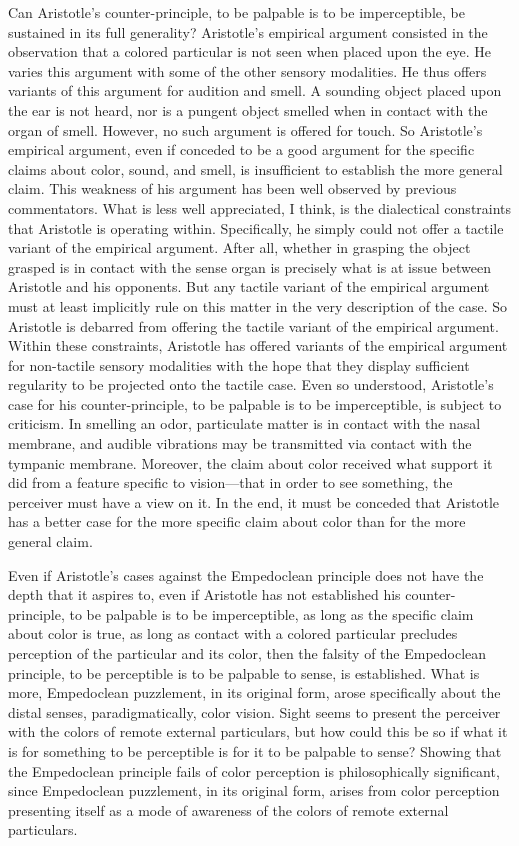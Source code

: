 Can Aristotle's counter-principle, to be palpable is to be imperceptible, be sustained in its full generality? Aristotle's empirical argument consisted in the observation that a colored particular is not seen when placed upon the eye. He varies this argument with some of the other sensory modalities. He thus offers variants of this argument for audition and smell. A sounding object placed upon the ear is not heard, nor is a pungent object smelled when in contact with the organ of smell. However, no such argument is offered for touch. So Aristotle's empirical argument, even if conceded to be a good argument for the specific claims about color, sound, and smell, is insufficient to establish the more general claim. This weakness of his argument has been well observed by previous commentators. What is less well appreciated, I think, is the dialectical constraints that Aristotle is operating within. Specifically, he simply could not offer a tactile variant of the empirical argument. After all, whether in grasping the object grasped is in contact with the sense organ is precisely what is at issue between Aristotle and his opponents. But any tactile variant of the empirical  argument must at least implicitly rule on this matter in the very description of the case. So Aristotle is debarred from offering the tactile variant of the empirical argument. Within these constraints, Aristotle has offered variants of the empirical argument for non-tactile sensory modalities with the hope that they display sufficient regularity to be projected onto the tactile case. Even so understood, Aristotle's case for his counter-principle, to be palpable is to be imperceptible, is subject to criticism. In smelling an odor, particulate matter is in contact with the nasal membrane, and audible vibrations may be transmitted via contact with the tympanic membrane. Moreover, the claim about color received what support it did from a feature specific to vision---that in order to see something, the perceiver must have a view on it. In the end, it must be conceded that Aristotle has a better case for the more specific claim about color than for the more general claim.

Even if Aristotle's cases against the Empedoclean principle does not have the depth that it aspires to, even if Aristotle has not established his counter-principle, to be palpable is to be imperceptible, as long as the specific claim about color is true, as long as contact with a colored particular precludes perception of the particular and its color, then the falsity of the Empedoclean principle, to be perceptible is to be palpable to sense, is established. What is more, Empedoclean puzzlement, in its original form, arose specifically about the distal senses, paradigmatically, color vision. Sight seems to present the perceiver with the colors of remote external particulars, but how could this be so if what it is for something to be perceptible is for it to be palpable to sense? Showing that the Empedoclean principle fails of color perception is philosophically significant, since Empedoclean puzzlement, in its original form, arises from color perception presenting itself as a mode of awareness of the colors of remote external particulars. 

